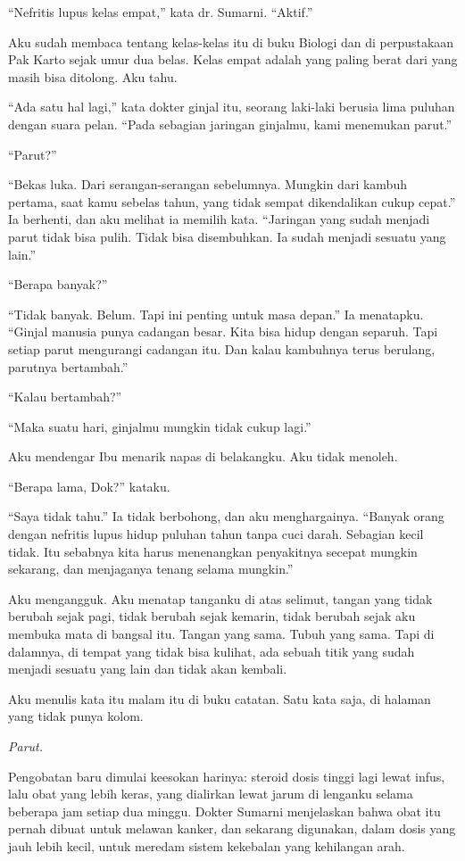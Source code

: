\documentclass[11pt,twoside,openany]{book}
\makeatletter
\newcommand{\scenebreak}{\par\vspace{0.9em}{\centering\textsc{*\hspace{0.7em}*\hspace{0.7em}*}\par}\vspace{0.9em}\@afterindentfalse\@afterheading}
\makeatother
\begin{document}
``Nefritis lupus kelas empat,'' kata dr. Sumarni. ``Aktif.''

Aku sudah membaca tentang kelas-kelas itu di buku Biologi dan di perpustakaan Pak Karto sejak umur dua belas. Kelas empat adalah yang paling berat dari yang masih bisa ditolong. Aku tahu.

``Ada satu hal lagi,'' kata dokter ginjal itu, seorang laki-laki berusia lima puluhan dengan suara pelan. ``Pada sebagian jaringan ginjalmu, kami menemukan parut.''

``Parut?''

``Bekas luka. Dari serangan-serangan sebelumnya. Mungkin dari kambuh pertama, saat kamu sebelas tahun, yang tidak sempat dikendalikan cukup cepat.'' Ia berhenti, dan aku melihat ia memilih kata. ``Jaringan yang sudah menjadi parut tidak bisa pulih. Tidak bisa disembuhkan. Ia sudah menjadi sesuatu yang lain.''

``Berapa banyak?''

``Tidak banyak. Belum. Tapi ini penting untuk masa depan.'' Ia menatapku. ``Ginjal manusia punya cadangan besar. Kita bisa hidup dengan separuh. Tapi setiap parut mengurangi cadangan itu. Dan kalau kambuhnya terus berulang, parutnya bertambah.''

``Kalau bertambah?''

``Maka suatu hari, ginjalmu mungkin tidak cukup lagi.''

Aku mendengar Ibu menarik napas di belakangku. Aku tidak menoleh.

``Berapa lama, Dok?'' kataku.

``Saya tidak tahu.'' Ia tidak berbohong, dan aku menghargainya. ``Banyak orang dengan nefritis lupus hidup puluhan tahun tanpa cuci darah. Sebagian kecil tidak. Itu sebabnya kita harus menenangkan penyakitnya secepat mungkin sekarang, dan menjaganya tenang selama mungkin.''

Aku mengangguk. Aku menatap tanganku di atas selimut, tangan yang tidak berubah sejak pagi, tidak berubah sejak kemarin, tidak berubah sejak aku membuka mata di bangsal itu. Tangan yang sama. Tubuh yang sama. Tapi di dalamnya, di tempat yang tidak bisa kulihat, ada sebuah titik yang sudah menjadi sesuatu yang lain dan tidak akan kembali.

Aku menulis kata itu malam itu di buku catatan. Satu kata saja, di halaman yang tidak punya kolom.

\emph{Parut.}

\scenebreak
Pengobatan baru dimulai keesokan harinya: steroid dosis tinggi lagi lewat infus, lalu obat yang lebih keras, yang dialirkan lewat jarum di lenganku selama beberapa jam setiap dua minggu. Dokter Sumarni menjelaskan bahwa obat itu pernah dibuat untuk melawan kanker, dan sekarang digunakan, dalam dosis yang jauh lebih kecil, untuk meredam sistem kekebalan yang kehilangan arah.
\end{document}
